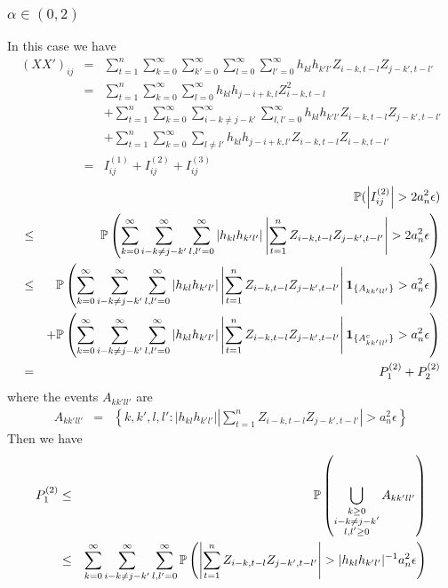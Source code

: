\documentclass{article}
\begin{document}
\subsubsection[alpha in (0,2)]{$\alpha \in (0,2)$}
In this case we have
\begin{eqnarray*}
  (XX')_{ij} &=& \sum_{t=1}^n \sum_{k=0}^\infty \sum_{k'=0}^\infty
  \sum_{l=0}^\infty \sum_{l'=0}^\infty h_{kl} h_{k'l'} Z_{i-k,t-l}
  Z_{j-k',t-l'} \\
  &=& \sum_{t=1}^n \sum_{k=0}^\infty \sum_{l=0}^\infty h_{kl}
  h_{j-i+k,l} Z_{i-k, t-l}^2 \\
  && + \sum_{t=1}^n \sum_{k=0}^\infty \sum_{i-k \neq j-k'}^\infty
  \sum_{l,l'=0}^\infty h_{kl} h_{k'l'} Z_{i-k,t-l} Z_{j-k',t-l'} \\
  && + \sum_{t=1}^n \sum_{k=0}^\infty \sum_{l\neq l'} h_{kl}
  h_{j-i+k, l'} Z_{i-k,t-l} Z_{i-k,t-l'} \\
  &=& I^{(1)}_{ij} + I^{(2)}_{ij} + I^{(3)}_{ij}
\end{eqnarray*}
\begin{eqnarray*}
  && \mathbb{P}(\left| I^{(2)}_{ij} \right| > 2 a_n^2 \epsilon) \\
  &\leq& \mathbb{P}\left(
    \sum_{k=0}^\infty \sum_{i-k \neq j-k'}^\infty
    \sum_{l,l'=0}^\infty | h_{kl} h_{k'l'}| \left|
      \sum_{t=1}^n  Z_{i-k,t-l} Z_{j-k',t-l'} \right| > 2 a_n^2
    \epsilon \right) \\
  &\leq& \mathbb{P}\left(
    \sum_{k=0}^\infty \sum_{i-k \neq j-k'}^\infty
    \sum_{l,l'=0}^\infty | h_{kl} h_{k'l'}| \left|
      \sum_{t=1}^n  Z_{i-k,t-l} Z_{j-k',t-l'} \right|
    \mathbf{1}_{\{A_{kk'll'}\}} > a_n^2 \epsilon
  \right) \\
  && + \mathbb{P}\left(
    \sum_{k=0}^\infty \sum_{i-k \neq j-k'}^\infty
    \sum_{l,l'=0}^\infty | h_{kl} h_{k'l'}| \left|
      \sum_{t=1}^n  Z_{i-k,t-l} Z_{j-k',t-l'} \right|
    \mathbf{1}_{\{A^c_{kk'll'}\}} > a_n^2 \epsilon
  \right) \\
  &=& P^{(2)}_1 + P^{(2)}_2
\end{eqnarray*}
where the events $A_{kk'll'}$ are
\begin{eqnarray*}
  A_{kk'll'} &=& \left\{
  k,k',l,l': | h_{kl} h_{k'l'}| \left| \sum_{t=1}^n  Z_{i-k,t-l} Z_{j-k',t-l'}
  \right| > a_n^2 \epsilon
  \right\}
\end{eqnarray*}
Then we have
\begin{eqnarray*}
  P^{(2)}_1 &\leq& \mathbb{P}\left(
    \bigcup_{\substack{k \geq 0 \\ i-k \neq j-k' \\ l,l'\geq0}}
    A_{kk'll'}
  \right) \\
  &\leq& \sum_{k=0}^\infty \sum_{i-k \neq j-k'}^\infty
  \sum_{l,l'=0}^\infty \mathbb{P}\left(
    \left| \sum_{t=1}^n  Z_{i-k,t-l} Z_{j-k',t-l'}
    \right| > | h_{kl} h_{k'l'}|^{-1} a_n^2 \epsilon 
  \right)
\end{eqnarray*}
\end{document}
